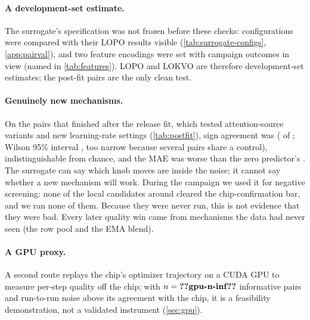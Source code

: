 \paragraph{A development-set estimate.} The surrogate's specification was not frozen before these checks:
\docnum{} configurations were compared with their LOPO results visible (\cref{tab:surrogate-configs},
\cref{app:pairval}), and two feature encodings were set with campaign outcomes in view (named in
\cref{tab:features}). LOPO and LOKVO are therefore development-set estimates; the  post-fit pairs
are the only clean test.

\paragraph{Genuinely new mechanisms.} On the  pairs that finished after the release fit, which tested
attention-source variants and new learning-rate settings (\cref{tab:postfit}), sign agreement was 
( of ; Wilson 95\% interval , too narrow because several pairs
share a control), indistinguishable from chance, and the MAE  was worse than the zero predictor's
. The surrogate can say which knob moves are inside the noise; it cannot say whether a new
mechanism will work. During the campaign we used it for negative screening: none of the \docnum{} local
candidates around  cleared the chip-confirmation bar, and we ran none of them. Because they were never run,
this is not evidence that they were bad. Every later quality win came from mechanisms the data had never seen (the
row pool and the EMA blend).

\paragraph{A GPU proxy.} A second route replays the chip's optimizer trajectory on a CUDA GPU to measure per-step
quality off the chip; with $n=\val{gpu-n-inf}$ informative pairs and run-to-run noise above its agreement with the
chip, it is a feasibility demonstration, not a validated instrument (\cref{sec:gpu}).
